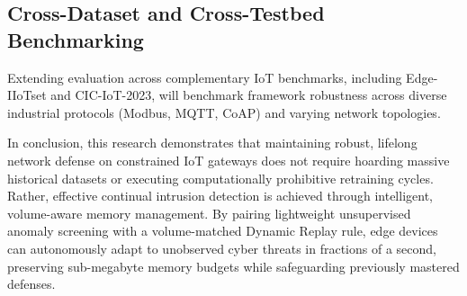 \subsection{Cross-Dataset and Cross-Testbed Benchmarking}
Extending evaluation across complementary IoT benchmarks, including Edge-IIoTset and CIC-IoT-2023, will benchmark framework robustness across diverse industrial protocols (Modbus, MQTT, CoAP) and varying network topologies.

\vspace{0.5cm}
In conclusion, this research demonstrates that maintaining robust, lifelong network defense on constrained IoT gateways does not require hoarding massive historical datasets or executing computationally prohibitive retraining cycles. Rather, effective continual intrusion detection is achieved through intelligent, volume-aware memory management. By pairing lightweight unsupervised anomaly screening with a volume-matched Dynamic Replay rule, edge devices can autonomously adapt to unobserved cyber threats in fractions of a second, preserving sub-megabyte memory budgets while safeguarding previously mastered defenses.
